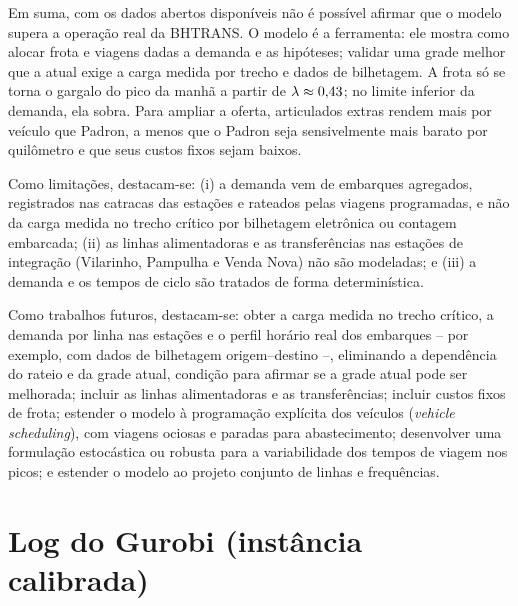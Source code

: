 \documentclass[11pt,a4paper]{article}
\begin{document}
Em suma, com os dados abertos disponíveis não é possível afirmar que o modelo
supera a operação real da BHTRANS. O modelo é a ferramenta: ele mostra como
alocar frota e viagens dadas a demanda e as hipóteses; validar uma grade melhor
que a atual exige a carga medida por trecho e dados de bilhetagem.
A frota só se torna o gargalo do pico da manhã a partir de
$\lambda\approx0{,}43$; no limite inferior da demanda, ela sobra. Para
ampliar a oferta, articulados extras rendem mais por veículo que Padron, a
menos que o Padron seja sensivelmente mais barato por quilômetro e que seus
custos fixos sejam baixos.

Como limitações, destacam-se: (i) a demanda vem de embarques agregados,
registrados nas catracas das estações e rateados pelas viagens programadas, e
não da carga medida no trecho crítico por bilhetagem eletrônica ou contagem
embarcada; (ii) as linhas alimentadoras e as transferências nas estações de
integração (Vilarinho, Pampulha e Venda Nova) não são modeladas; e (iii) a
demanda e os tempos de ciclo são tratados de forma determinística.

Como trabalhos futuros, destacam-se: obter a carga medida no trecho crítico, a
demanda por linha nas estações e o perfil horário real dos embarques -- por
exemplo, com dados de bilhetagem origem--destino --, eliminando a dependência do
rateio e da grade atual, condição para afirmar se a grade atual pode ser
melhorada; incluir as linhas alimentadoras e as transferências; incluir custos
fixos de frota; estender o modelo à programação explícita dos veículos
(\emph{vehicle scheduling}), com viagens ociosas e paradas para abastecimento;
desenvolver uma formulação estocástica ou robusta para a variabilidade dos
tempos de viagem nos picos; e estender o modelo ao projeto conjunto de linhas e
frequências.




\appendix
\section{Log do Gurobi (instância calibrada)}\label{ap:log}
{\footnotesize}
\end{document}
